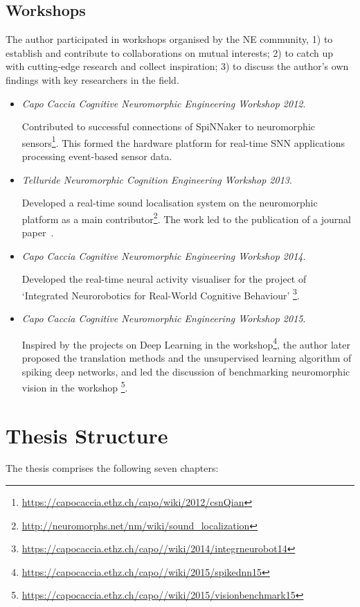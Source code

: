 \subsection{Workshops}
The author participated in workshops organised by the NE community, 1) to establish and contribute to collaborations on mutual interests; 2) to catch up with cutting-edge research and collect inspiration; 3) to discuss the author's own findings with key researchers in the field.
\begin{itemize}
	\item 
	\textit{Capo Caccia Cognitive Neuromorphic Engineering Workshop 2012}.
	
	Contributed to successful connections of SpiNNaker to neuromorphic sensors\footnote{\url{https://capocaccia.ethz.ch/capo/wiki/2012/csnQian}}. 
	This formed the hardware platform for real-time SNN applications processing event-based sensor data.
	
	\item 
	\textit{Telluride Neuromorphic Cognition Engineering Workshop 2013}.
	
	Developed a real-time sound localisation system on the neuromorphic platform as a main contributor\footnote{\url{http://neuromorphs.net/nm/wiki/sound_localization}}.
	The work led to the publication of a journal paper~\citep{lagorce2015breaking}.
	
	
	\item 
	\textit{Capo Caccia Cognitive Neuromorphic Engineering Workshop 2014}.
	
	Developed the real-time neural activity visualiser for the project of `Integrated Neurorobotics for Real-World Cognitive Behaviour' \footnote{\url{https://capocaccia.ethz.ch/capo//wiki/2014/integrneurobot14}}. 
	
	\item 
	\textit{Capo Caccia Cognitive Neuromorphic Engineering Workshop 2015}.
	
	Inspired by the projects on Deep Learning in the workshop\footnote{\url{https://capocaccia.ethz.ch/capo//wiki/2015/spikednn15}}, the author later proposed the translation methods and the unsupervised learning algorithm of spiking deep networks, and led the discussion of benchmarking neuromorphic vision in the workshop \footnote{\url{https://capocaccia.ethz.ch/capo//wiki/2015/visionbenchmark15}}. 	
\end{itemize}
\section{Thesis Structure}
The thesis comprises the following seven chapters:

